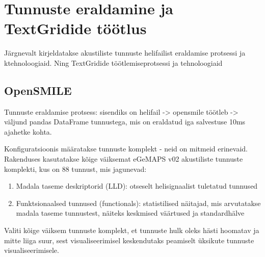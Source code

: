 \section{Tunnuste eraldamine ja TextGridide töötlus}
Järgnevalt kirjeldatakse akustiliste tunnuste helifailist eraldamise protsessi ja ktehnoloogiaid. Ning TextGridide töötlemiseprotsessi ja tehnoloogiaid

\subsection{OpenSMILE}
Tunnuste eraldamise protsess: sisendiks on helifail -> opensmile töötleb -> väljund pandas DataFrame tunnustega, mis on eraldatud iga salvestuse 10ms ajahetke kohta.

Konfiguratsioonis määratakse tunnuste komplekt - neid on mitmeid erinevaid. Rakenduses kasutatakse kõige väiksemat eGeMAPS v02 akustiliste tunnuste komplekti, kus on 88 tunnust, mis jagunevad:

\begin{enumerate}
    \item Madala taseme deskriptorid (LLD): otseselt helisignaalist tuletatud tunnused
    \item Funktsionaalsed tunnused (functionals): statistilised näitajad, mis arvutatakse madala taseme tunnustest, näiteks keskmised väärtused ja standardhälve
\end{enumerate}

Valiti kõige väiksem tunnuste komplekt, et tunnuste hulk oleks hästi hoomatav ja mitte liiga suur, sest visualiseerimisel keskendutaks peamiselt üksikute tunnuste visualiseerimisele.

